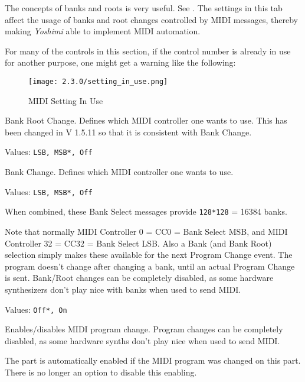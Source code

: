    \setcounter{ItemCounter}{0}      %

   The concepts of banks and roots is very useful.
   See .
   The settings in this tab affect the usage of banks and root changes
   controlled by MIDI messages, thereby making \textsl{Yoshimi} able to
   implement MIDI automation.

   For many of the controls in this section, if the control number is
   already in use for another purpose, one might get a warning like the
   following:

\begin{figure}[H]
   \centering
   \texttt{[image: 2.3.0/setting\_in\_use.png]}
   \caption[MIDI Setting In Use]{MIDI Setting In Use}
   \label{fig:yoshimi_settings_in_use}
\end{figure}

   Bank Root Change.
   Defines which MIDI controller one wants to use. This has been changed in
   V 1.5.11 so that it is consistent with Bank Change.

   Values: \texttt{LSB, MSB*, Off}

   Bank Change.
   Defines which MIDI controller one wants to use.

   Values: \texttt{LSB, MSB*, Off}

   When combined, these Bank Select messages provide
   \texttt{128*128} = 16384 banks.

   Note that normally MIDI Controller 0 = CC0 = Bank Select MSB, and MIDI
   Controller 32 = CC32 = Bank Select LSB. Also a Bank (and Bank Root)
   selection simply makes these available for the next Program Change event.
   The program doesn't change after changing a bank, until an actual Program
   Change is sent. Bank/Root changes can be completely disabled, as some
   hardware synthesizers don't play nice with banks when used to send MIDI.


   Values: \texttt{Off*, On}

   Enables/disables MIDI program change.
   Program changes can be completely disabled, as some hardware synths don't
   play nice when used to send MIDI.

   The part is automatically enabled if the MIDI program was changed on this
   part.  There is no longer an option to disable this enabling.

